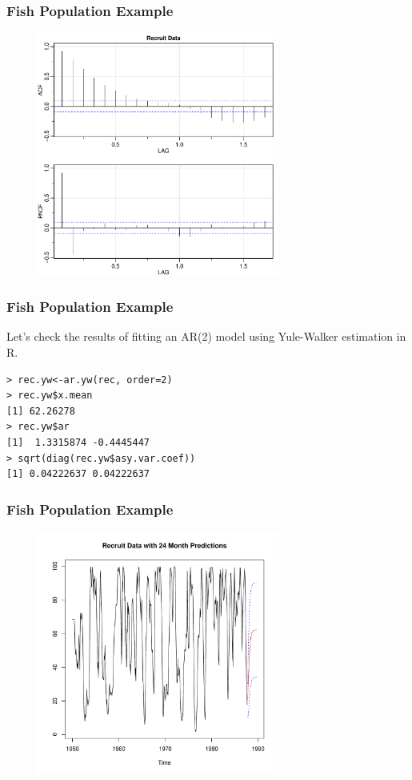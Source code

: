 \documentclass[%
xcolor=pdftex]{beamer}
\begin{document}
\begin{frame}
\frametitle{Fish Population Example}

\includegraphics[width=100mm, height=80mm]{recruit.pdf}

\end{frame}


\begin{frame}[fragile]
\frametitle{Fish Population Example}

Let's check the results of fitting an AR(2) model using Yule-Walker estimation in R.

\begin{verbatim}
> rec.yw<-ar.yw(rec, order=2)
> rec.yw$x.mean
[1] 62.26278
> rec.yw$ar
[1]  1.3315874 -0.4445447
> sqrt(diag(rec.yw$asy.var.coef))
[1] 0.04222637 0.04222637
\end{verbatim}

\end{frame}

\begin{frame}
\frametitle{Fish Population Example}

\includegraphics[width=100mm, height=80mm]{pred.pdf}

\end{frame}
\end{document}
